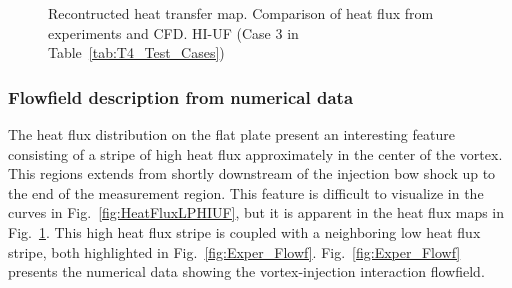 \documentclass{AIAA}
\begin{document}
\begin{figure}[!h]
\center
\begin{adjustbox}{max width=1.1\columnwidth,center}
%
\end{adjustbox}
\caption{Recontructed heat transfer map. Comparison of heat flux from experiments and CFD. HI-UF (Case 3 in Table~\ref{tab:T4_Test_Cases})}
\label{fig:HeatFluxMap}
\end{figure} 



\subsubsection{Flowfield description from numerical data}

The heat flux distribution on the flat plate present an interesting feature consisting of a stripe of high heat flux approximately in the center of the vortex.
This regions extends from shortly downstream of the injection bow shock up to the end of the measurement region.
This feature is difficult to visualize in the curves in Fig.~\ref{fig:HeatFluxLPHIUF}, but it is apparent in the heat flux maps in Fig.~\ref{fig:HeatFluxMap}.
This high heat flux stripe is coupled with a neighboring low heat flux stripe, both highlighted in Fig.~\ref{fig:Exper_Flowf}. Fig.~\ref{fig:Exper_Flowf} presents the numerical data showing the vortex-injection interaction flowfield. 
\end{document}
